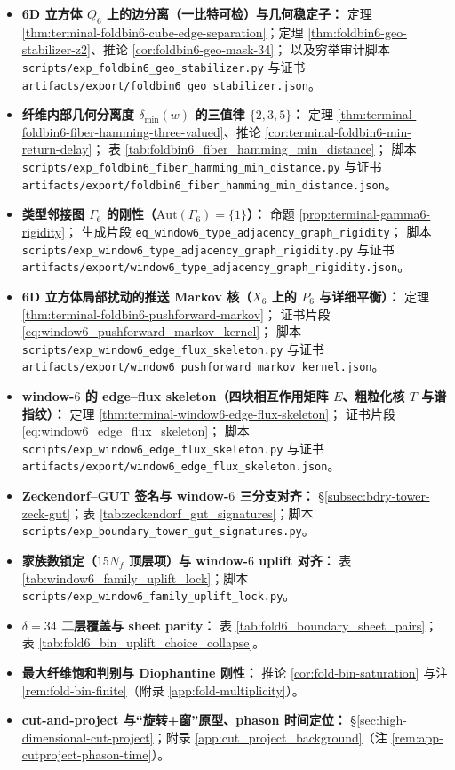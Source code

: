 \begin{itemize}
  \item \textbf{6D 立方体 \(Q_6\) 上的边分离（一比特可检）与几何稳定子：}
  定理 \ref{thm:terminal-foldbin6-cube-edge-separation}；定理 \ref{thm:foldbin6-geo-stabilizer-z2}、推论 \ref{cor:foldbin6-geo-mask-34}；
  以及穷举审计脚本 \texttt{scripts/exp\_foldbin6\_geo\_stabilizer.py} 与证书 \texttt{artifacts/export/foldbin6\_geo\_stabilizer.json}。
  \item \textbf{纤维内部几何分离度 \(\delta_{\min}(w)\) 的三值律 \(\{2,3,5\}\)：}
  定理 \ref{thm:terminal-foldbin6-fiber-hamming-three-valued}、推论 \ref{cor:terminal-foldbin6-min-return-delay}；
  表 \ref{tab:foldbin6_fiber_hamming_min_distance}；
  脚本 \texttt{scripts/exp\_foldbin6\_fiber\_hamming\_min\_distance.py} 与证书 \texttt{artifacts/export/foldbin6\_fiber\_hamming\_min\_distance.json}。
  \item \textbf{类型邻接图 \(\Gamma_6\) 的刚性（\(\mathrm{Aut}(\Gamma_6)=\{1\}\)）：}
  命题 \ref{prop:terminal-gamma6-rigidity}；
  生成片段 \texttt{eq\_window6\_type\_adjacency\_graph\_rigidity}；
  脚本 \texttt{scripts/exp\_window6\_type\_adjacency\_graph\_rigidity.py} 与证书 \texttt{artifacts/export/window6\_type\_adjacency\_graph\_rigidity.json}。
  \item \textbf{6D 立方体局部扰动的推送 Markov 核（\(X_6\) 上的 \(P_6\) 与详细平衡）：}
  定理 \ref{thm:terminal-foldbin6-pushforward-markov}；
  证书片段 \eqref{eq:window6_pushforward_markov_kernel}；
  脚本 \texttt{scripts/exp\_window6\_edge\_flux\_skeleton.py} 与证书 \texttt{artifacts/export/window6\_pushforward\_markov\_kernel.json}。
  \item \textbf{window-\(6\) 的 edge--flux skeleton（四块相互作用矩阵 \(E\)、粗粒化核 \(T\) 与谱指纹）：}
  定理 \ref{thm:terminal-window6-edge-flux-skeleton}；
  证书片段 \eqref{eq:window6_edge_flux_skeleton}；
  脚本 \texttt{scripts/exp\_window6\_edge\_flux\_skeleton.py} 与证书 \texttt{artifacts/export/window6\_edge\_flux\_skeleton.json}。
  \item \textbf{Zeckendorf--GUT 签名与 window-\(6\) 三分支对齐：}
  \S\ref{subsec:bdry-tower-zeck-gut}；表 \ref{tab:zeckendorf_gut_signatures}；脚本 \texttt{scripts/exp\_boundary\_tower\_gut\_signatures.py}。
  \item \textbf{家族数锁定（\(15N_f\) 顶层项）与 window-\(6\) uplift 对齐：}
  表 \ref{tab:window6_family_uplift_lock}；脚本 \texttt{scripts/exp\_window6\_family\_uplift\_lock.py}。
  \item \textbf{\(\delta=34\) 二层覆盖与 sheet parity：}
  表 \ref{tab:fold6_boundary_sheet_pairs}；表 \ref{tab:fold6_bin_uplift_choice_collapse}。
  \item \textbf{最大纤维饱和判别与 Diophantine 刚性：}
  推论 \ref{cor:fold-bin-saturation} 与注 \ref{rem:fold-bin-finite}（附录 \ref{app:fold-multiplicity}）。
  \item \textbf{cut-and-project 与“旋转+\(\)窗”原型、phason 时间定位：}
  \S\ref{sec:high-dimensional-cut-project}；附录 \ref{app:cut_project_background}（注 \ref{rem:app-cutproject-phason-time}）。
\end{itemize}
